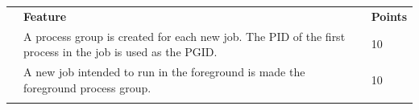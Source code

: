 \documentclass[10pt]{article}
\newcommand{\checkbox}[0]{\makebox[0pt][l]{$\square$}\raisebox{.15ex}{\hspace{0.1em}}}
\begin{document}
\begin{longtable}[c]{@{}lll@{}}
\toprule\addlinespace
\begin{minipage}[t]{0.06\columnwidth}\raggedright
\end{minipage} & \begin{minipage}[t]{0.74\columnwidth}\raggedright
\textbf{Feature}
\end{minipage} & \begin{minipage}[t]{0.11\columnwidth}\raggedright
\textbf{Points}
\end{minipage}
\\\addlinespace\hline\addlinespace
\begin{minipage}[t]{0.06\columnwidth}\raggedright
\end{minipage} \checkbox & \begin{minipage}[t]{0.74\columnwidth}\raggedright
A process group is created for each new job. The PID of the first
process in the job is used as the PGID.
\end{minipage} & \begin{minipage}[t]{0.11\columnwidth}\raggedright
10
\end{minipage}
\\\addlinespace\hline\addlinespace
\begin{minipage}[t]{0.06\columnwidth}\raggedright
\end{minipage} \checkbox & \begin{minipage}[t]{0.74\columnwidth}\raggedright
A new job intended to run in the foreground is made the foreground
process group.
\end{minipage} & \begin{minipage}[t]{0.11\columnwidth}\raggedright
10
\end{minipage}
\\\addlinespace\hline\addlinespace
\begin{minipage}[t]{0.06\columnwidth}\raggedright
\end{minipage} \checkbox & \begin{minipage}[t]{0.74\columnwidth}\raggedright

\end{minipage}
\end{longtable}
\end{document}
